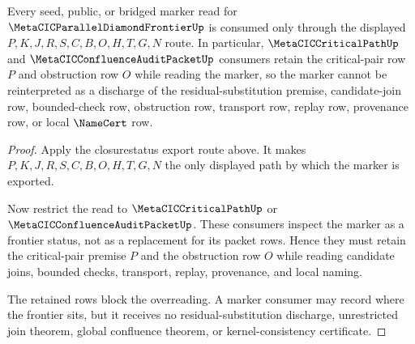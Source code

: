 \begin{theorem}
\label{thm:metacic-parallel-diamond-frontier-retained-premise-marker-route}
Every seed, public, or bridged marker read for $\MetaCICParallelDiamondFrontierUp$ is consumed only through the displayed $P,K,J,R,S,C,B,O,H,T,G,N$ route. In particular, $\MetaCICCriticalPathUp$ and $\MetaCICConfluenceAuditPacketUp$ consumers retain the critical-pair row $P$ and obstruction row $O$ while reading the marker, so the marker cannot be reinterpreted as a discharge of the residual-substitution premise, candidate-join row, bounded-check row, obstruction row, transport row, replay row, provenance row, or local $\NameCert$ row.
\end{theorem}
\begin{proof}
Apply the closurestatus export route above. It makes $P,K,J,R,S,C,B,O,H,T,G,N$ the only displayed path by which the marker is exported.

Now restrict the read to $\MetaCICCriticalPathUp$ or $\MetaCICConfluenceAuditPacketUp$. These consumers inspect the marker as a frontier status, not as a replacement for its packet rows. Hence they must retain the critical-pair premise $P$ and the obstruction row $O$ while reading candidate joins, bounded checks, transport, replay, provenance, and local naming.

The retained rows block the overreading. A marker consumer may record where the frontier sits, but it receives no residual-substitution discharge, unrestricted join theorem, global confluence theorem, or kernel-consistency certificate.
\end{proof}
